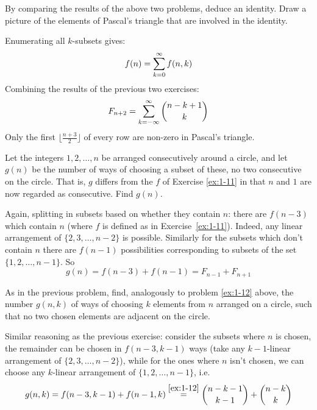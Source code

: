 \begin{exercise}
    By comparing the results of the above two problems, deduce an identity. Draw a picture of the elements of Pascal's triangle that are involved in the identity.
\end{exercise}
\begin{solution}
    Enumerating all $k$-subsets gives:
    \[
        f(n) = \bsum[k] f(n, k)
    \]
    Combining the results of the previous two exercises:
    \[
        F_{n+2} = \infsum[k] \binom{n-k+1}{k}  
    \]
    Only the first $\lfloor \frac{n+3}{2} \rfloor$ of every row are non-zero in Pascal's triangle.
\end{solution}

\begin{exercise}
    Let the integers $1,2, \ldots, n$ be arranged consecutively around a circle, and let $g(n)$ be the number of ways of choosing a subset of these, no two consecutive on the circle. That is, $g$ differs from the $f$ of Exercise \ref{ex:1-11} in that $n$ and $1$ are now regarded as consecutive. Find $g(n)$.
\end{exercise}
\begin{solution}
    Again, splitting in subsets based on whether they contain $n$: there are $f(n-3)$ which contain $n$ (where $f$ is defined as in Exercise~\ref{ex:1-11}). Indeed, any linear arrangement of $\{2, 3, \ldots, n-2\}$ is possible. Similarly for the subsets which don't contain $n$ there are $f(n-1)$ possibilities corresponding to subsets of the set $\{1, 2, \ldots, n-1\}$. So 
    \[
        g(n) = f(n-3) + f(n-1) = F_{n-1} + F_{n+1}
    \]
\end{solution}

\begin{exercise}
    As in the previous problem, find, analogously to problem \ref{ex:1-12} above, the number $g(n,k)$ of ways of choosing $k$ elements from $n$ arranged on a circle, such that no two chosen elements are adjacent on the circle.
\end{exercise}
\begin{solution}
    Similar reasoning as the previous exercise: consider the subsets where $n$ is chosen, the remainder can be chosen in $f(n-3,k-1)$ ways (take any $k-1$-linear arrangement of $\{2, 3, \ldots, n-2\}$), while for the ones where $n$ isn't chosen, we can choose any $k$-linear arrangement of $\{1,2,\ldots, n-1\}$, i.e. 
    \[
        g(n, k) = f(n-3, k-1) + f(n-1, k) \estep{ \ref{ex:1-12}} \binom{n-k-1}{k-1} + \binom{n-k}{k}
    \]
\end{solution}

